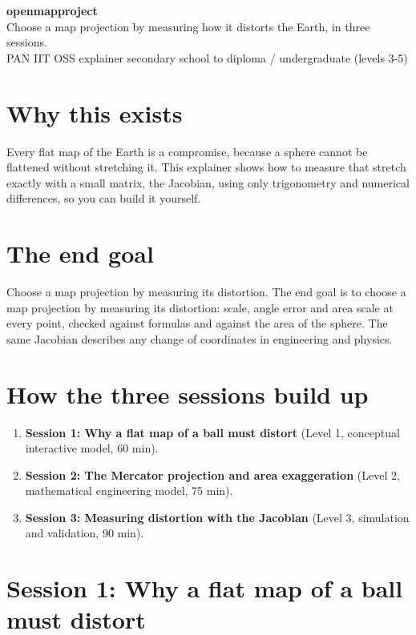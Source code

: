 \documentclass[11pt,a4paper]{article}
\begin{document}
\begin{center}{\LARGE\bfseries openmapproject}\\[0.4em]{\large Choose a map projection by measuring how it distorts the Earth, in three sessions.}\\[0.2em]\small PAN IIT OSS explainer \textbullet{} secondary school to diploma / undergraduate (levels 3-5)\end{center}

\section*{Why this exists}
Every flat map of the Earth is a compromise, because a sphere cannot be flattened without stretching it. This explainer shows how to measure that stretch exactly with a small matrix, the Jacobian, using only trigonometry and numerical differences, so you can build it yourself.

\section*{The end goal}
Choose a map projection by measuring its distortion. The end goal is to choose a map projection by measuring its distortion: scale, angle error and area scale at every point, checked against formulas and against the area of the sphere. The same Jacobian describes any change of coordinates in engineering and physics.

\section*{How the three sessions build up}
\begin{enumerate}[nosep]
\item \textbf{Session 1: Why a flat map of a ball must distort} (Level 1, conceptual interactive model, 60 min).
\item \textbf{Session 2: The Mercator projection and area exaggeration} (Level 2, mathematical engineering model, 75 min).
\item \textbf{Session 3: Measuring distortion with the Jacobian} (Level 3, simulation and validation, 90 min).
\end{enumerate}

\section{Session 1: Why a flat map of a ball must distort}
\end{document}
